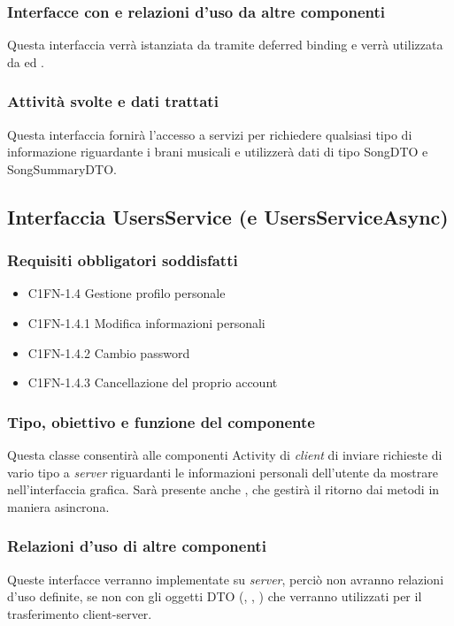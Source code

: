 \subsubsection*{Interfacce con e relazioni d'uso da altre componenti}
Questa interfaccia verr\`a istanziata da  tramite deferred
binding e verr\`a utilizzata da  ed .

\subsubsection*{Attivit\`a svolte e dati trattati}
Questa interfaccia fornir\`a l'accesso a servizi per richiedere qualsiasi tipo
di informazione riguardante i brani musicali e utilizzer\`a dati di tipo SongDTO
e SongSummaryDTO.

\subsection{Interfaccia UsersService (e UsersServiceAsync)}
\subsubsection*{Requisiti obbligatori soddisfatti}
\begin{itemize}
	\item C1FN-1.4 Gestione profilo personale
	\item C1FN-1.4.1 Modifica informazioni personali
	\item C1FN-1.4.2 Cambio password
	\item C1FN-1.4.3 Cancellazione del proprio account
\end{itemize}
\subsubsection*{Tipo, obiettivo e funzione del componente}
Questa classe consentir\`a alle componenti Activity di \emph{client} di inviare
richieste di vario tipo a \emph{server} riguardanti le informazioni personali
dell'utente da mostrare  nell'interfaccia grafica. Sar\`a presente anche
, che gestir\`a il ritorno dai metodi in maniera asincrona.

\subsubsection*{Relazioni d'uso di altre componenti}
Queste interfacce verranno implementate su \emph{server}, perci\`o non
avranno relazioni d'uso definite, se non con gli oggetti DTO (,
, ) che verranno utilizzati per il
trasferimento client-server.

